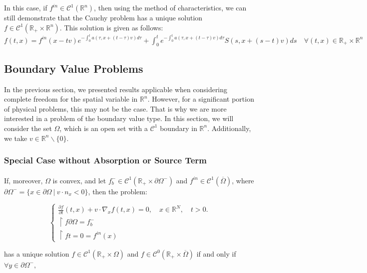 \documentclass[a4paper, 11pt]{article}
\begin{document}
In this case, if $f^{in} \in \mathcal{C}^1(\mathbb{R}^n)$, then using the method of characteristics, we can still demonstrate that the Cauchy problem has a unique solution $f \in \mathcal{C}^1(\mathbb{R}_+ \times \mathbb{R}^n)$. This solution is given as follows:\\
$\boxed{f(t,x)=f^{in}(x-tv) e^{-\int_0 ^t a(\tau,x+(t-\tau)v)d\tau} + \int_0 ^t  e^{-\int_0 ^t a(\tau,x+(t-\tau)v)d\tau} S(s,x+(s-t)v)ds \quad \forall (t,x) \in \mathbb{R}_+ \times \mathbb{R}^n }$

\subsection{Boundary Value Problems}

In the previous section, we presented results applicable when considering complete freedom for the spatial variable in $\mathbb{R}^n$. However, for a significant portion of physical problems, this may not be the case. That is why we are more interested in a problem of the boundary value type. In this section, we will consider the set $\Omega$, which is an open set with a $\mathcal{C}^1$ boundary in $\mathbb{R}^n$. Additionally, we take $v \in \mathbb{R}^n\backslash \{0\}$.

\subsubsection{Special Case without Absorption or Source Term}

\paragraph{}
If, moreover, $\Omega$ is convex, and let $f_b^- \in \mathcal{C}^1(\mathbb{R}_+ \times \partial \Omega^-)$ and $f^{in} \in \mathcal{C}^1(\overline{\Omega})$, where $\partial \Omega^- = \{x\in\partial \Omega~ | ~ v\cdot n_x<0\}$, then the problem:


\[
\begin{cases}
	\frac{\partial f}{\partial t}(t,x)+v \cdot \nabla_x f(t,x)=0, \quad x \in \mathbb{R}^N, \quad t>0.\\
	\restriction{f}{\partial \Omega}= f_b^-\\
	\restriction{f}{t=0}= f^{in}(x)
\end{cases}
\]

has a unique solution $f \in \mathcal{C}^1(\mathbb{R}_+ \times \Omega)$ and $f \in \mathcal{C}^0(\mathbb{R}_+ \times \overline{\Omega})$ if and only if $\forall y \in \partial \Omega^-,$
\end{document}
